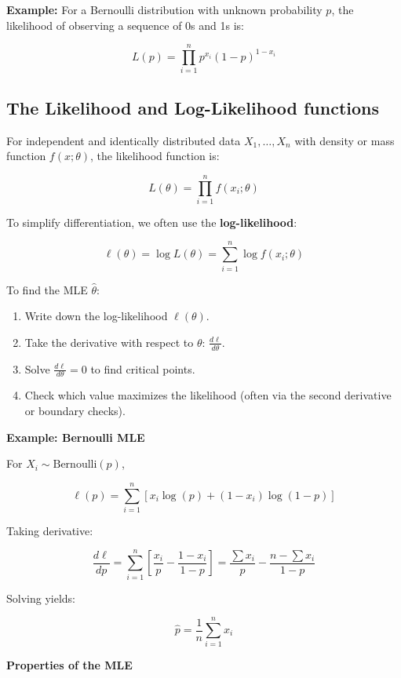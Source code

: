 \documentclass{book}
\begin{document}
\textbf{Example:} For a Bernoulli distribution with unknown probability $p$, the likelihood of observing a sequence of 0s and 1s is:

\[
L(p) = \prod_{i=1}^{n} p^{x_i}(1-p)^{1 - x_i}
\]

\subsection{The Likelihood and Log-Likelihood functions}

For independent and identically distributed data $X_1, \dots, X_n$ with density or mass function $f(x; \theta)$, the likelihood function is:

\[
L(\theta) = \prod_{i=1}^{n} f(x_i; \theta)
\]

To simplify differentiation, we often use the \textbf{log-likelihood}:

\[
\ell(\theta) = \log L(\theta) = \sum_{i=1}^{n} \log f(x_i; \theta)
\]

To find the MLE $\hat{\theta}$:

\begin{enumerate}
    \item Write down the log-likelihood $\ell(\theta)$.
    \item Take the derivative with respect to $\theta$: $\frac{d\ell}{d\theta}$.
    \item Solve $\frac{d\ell}{d\theta} = 0$ to find critical points.
    \item Check which value maximizes the likelihood (often via the second derivative or boundary checks).
\end{enumerate}

\textbf{Example: Bernoulli MLE}

For $X_i \sim \text{Bernoulli}(p)$,

\[
\ell(p) = \sum_{i=1}^{n} \left[x_i \log(p) + (1 - x_i)\log(1 - p)\right]
\]

Taking derivative:

\[
\frac{d\ell}{dp} = \sum_{i=1}^{n} \left[\frac{x_i}{p} - \frac{1 - x_i}{1 - p}\right] = \frac{\sum x_i}{p} - \frac{n - \sum x_i}{1 - p}
\]

Solving yields:

\[
\hat{p} = \frac{1}{n} \sum_{i=1}^{n} x_i
\]

\textbf{Properties of the MLE}
\end{document}
